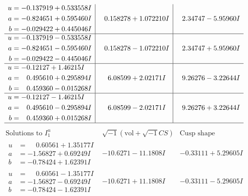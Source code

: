 \documentclass[1p]{elsarticle_modified}
\theoremstyle{definition}
\newcommand{\I}{\sqrt{-1}}
\begin{document}
$$\begin{array}{c|c|c}
\begin{aligned}
u &= -0.137919 + 0.533558 I \\
a &= -0.824651 + 0.595460 I \\
b &= -0.029422 + 0.445046 I\end{aligned}
 & \phantom{-}0.158278 + 1.072210 I & \phantom{-}2.34747 - 5.95960 I \\ \hline\begin{aligned}
u &= -0.137919 - 0.533558 I \\
a &= -0.824651 - 0.595460 I \\
b &= -0.029422 - 0.445046 I\end{aligned}
 & \phantom{-}0.158278 - 1.072210 I & \phantom{-}2.34747 + 5.95960 I \\ \hline\begin{aligned}
u &= -0.12127 + 1.46215 I \\
a &= \phantom{-}0.495610 + 0.295894 I \\
b &= \phantom{-}0.459360 - 0.015268 I\end{aligned}
 & \phantom{-}6.08599 + 2.02171 I & \phantom{-}9.26276 - 3.22644 I \\ \hline\begin{aligned}
u &= -0.12127 - 1.46215 I \\
a &= \phantom{-}0.495610 - 0.295894 I \\
b &= \phantom{-}0.459360 + 0.015268 I\end{aligned}
 & \phantom{-}6.08599 - 2.02171 I & \phantom{-}9.26276 + 3.22644 I\\
 \hline 
 \end{array}$$\newpage$$\begin{array}{c|c|c}  
\text{Solutions to }I^u_{1}& \I (\text{vol} + \sqrt{-1}CS) & \text{Cusp shape}\\
 \hline 
\begin{aligned}
u &= \phantom{-}0.60561 + 1.35177 I \\
a &= -1.56827 + 0.69249 I \\
b &= -0.78424 + 1.62391 I\end{aligned}
 & -10.6271 - 11.1808 I & -0.33111 + 5.29605 I \\ \hline\begin{aligned}
u &= \phantom{-}0.60561 - 1.35177 I \\
a &= -1.56827 - 0.69249 I \\
b &= -0.78424 - 1.62391 I\end{aligned}
 & -10.6271 + 11.1808 I & -0.33111 - 5.29605 I \\ \hline\begin{aligned}

\end{aligned}
\end{array}$$
\end{document}
